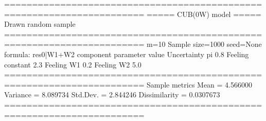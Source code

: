 \documentclass[letterpaper,10pt,english]{sphinxmanual}
\begin{document}
\begin{sphinxVerbatim}[commandchars=\\\{\}]
=======================================================================
=====\PYGZgt{}\PYGZgt{}\PYGZgt{} CUB(0W) model \PYGZlt{}\PYGZlt{}\PYGZlt{}===== Drawn random sample
=======================================================================
m=10  Sample size=1000  seed=None
formula: res\PYGZti{}0|W1+W2
\PYGZhy{}\PYGZhy{}\PYGZhy{}\PYGZhy{}\PYGZhy{}\PYGZhy{}\PYGZhy{}\PYGZhy{}\PYGZhy{}\PYGZhy{}\PYGZhy{}\PYGZhy{}\PYGZhy{}\PYGZhy{}\PYGZhy{}\PYGZhy{}\PYGZhy{}\PYGZhy{}\PYGZhy{}\PYGZhy{}\PYGZhy{}\PYGZhy{}\PYGZhy{}\PYGZhy{}\PYGZhy{}\PYGZhy{}\PYGZhy{}\PYGZhy{}\PYGZhy{}\PYGZhy{}\PYGZhy{}\PYGZhy{}\PYGZhy{}\PYGZhy{}\PYGZhy{}\PYGZhy{}\PYGZhy{}\PYGZhy{}\PYGZhy{}\PYGZhy{}\PYGZhy{}\PYGZhy{}\PYGZhy{}\PYGZhy{}\PYGZhy{}\PYGZhy{}\PYGZhy{}\PYGZhy{}\PYGZhy{}\PYGZhy{}\PYGZhy{}\PYGZhy{}\PYGZhy{}\PYGZhy{}\PYGZhy{}\PYGZhy{}\PYGZhy{}\PYGZhy{}\PYGZhy{}\PYGZhy{}\PYGZhy{}\PYGZhy{}\PYGZhy{}\PYGZhy{}\PYGZhy{}\PYGZhy{}\PYGZhy{}\PYGZhy{}\PYGZhy{}\PYGZhy{}\PYGZhy{}
  component parameter  value
Uncertainty        pi    0.8
    Feeling  constant    2.3
    Feeling        W1    0.2
    Feeling        W2   \PYGZhy{}5.0
=======================================================================
Sample metrics
Mean     = 4.566000
Variance = 8.089734
Std.Dev. = 2.844246
\PYGZhy{}\PYGZhy{}\PYGZhy{}\PYGZhy{}\PYGZhy{}\PYGZhy{}\PYGZhy{}\PYGZhy{}\PYGZhy{}\PYGZhy{}\PYGZhy{}\PYGZhy{}\PYGZhy{}\PYGZhy{}\PYGZhy{}\PYGZhy{}\PYGZhy{}\PYGZhy{}\PYGZhy{}\PYGZhy{}\PYGZhy{}\PYGZhy{}\PYGZhy{}\PYGZhy{}\PYGZhy{}\PYGZhy{}\PYGZhy{}\PYGZhy{}\PYGZhy{}\PYGZhy{}\PYGZhy{}\PYGZhy{}\PYGZhy{}\PYGZhy{}\PYGZhy{}\PYGZhy{}\PYGZhy{}\PYGZhy{}\PYGZhy{}\PYGZhy{}\PYGZhy{}\PYGZhy{}\PYGZhy{}\PYGZhy{}\PYGZhy{}\PYGZhy{}\PYGZhy{}\PYGZhy{}\PYGZhy{}\PYGZhy{}\PYGZhy{}\PYGZhy{}\PYGZhy{}\PYGZhy{}\PYGZhy{}\PYGZhy{}\PYGZhy{}\PYGZhy{}\PYGZhy{}\PYGZhy{}\PYGZhy{}\PYGZhy{}\PYGZhy{}\PYGZhy{}\PYGZhy{}\PYGZhy{}\PYGZhy{}\PYGZhy{}\PYGZhy{}\PYGZhy{}\PYGZhy{}
Dissimilarity = 0.0307673
=======================================================================
\end{sphinxVerbatim}
\def\sphinxLiteralBlockLabel{\label{\detokenize{manual:id45}}}
\begin{sphinxVerbatim}[commandchars=\\\{\},numbers=left,firstnumber=1,stepnumber=1]
\end{sphinxVerbatim}
\end{document}
